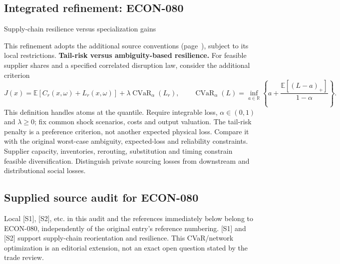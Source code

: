\documentclass[11pt,a4paper]{article}
\begin{document}
\subsection*{Integrated refinement: ECON-080}
{\sffamily\small\color{muted}Supply-chain resilience versus specialization gains\par}
This refinement adopts the additional source conventions
(page~\pageref{audited:conventions}), subject to its local restrictions.
\textbf{Tail-risk versus ambiguity-based resilience.}
For feasible supplier shares and a specified correlated disruption law, consider
the additional criterion
\[
J(x)=\mathbb E[C_r(x,\omega)+L_r(x,\omega)]
       +\lambda\operatorname{CVaR}_\alpha(L_r),\qquad
\operatorname{CVaR}_\alpha(L)=\inf_{a\in\mathbb R}
\left\{a+\frac{\mathbb E[(L-a)_+]}{1-\alpha}\right\}.
\]
This definition handles atoms at the quantile. Require integrable loss,
$\alpha\in(0,1)$ and $\lambda\geq0$; fix common shock scenarios, costs and
output valuation. The tail-risk penalty is a preference criterion, not another
expected physical loss. Compare it with the original worst-case ambiguity,
expected-loss and reliability constraints. Supplier capacity, inventories,
rerouting, substitution and timing constrain feasible diversification. Distinguish
private sourcing losses from downstream and distributional social losses.
\subsection*{Supplied source audit for ECON-080}
Local [S1], [S2], etc. in this audit and the references immediately below
belong to ECON-080, independently of the original entry's reference numbering.
[S1] and [S2] support supply-chain reorientation and resilience. This CVaR/network optimization is an editorial extension, not an exact open question stated by the trade review.
\end{document}
